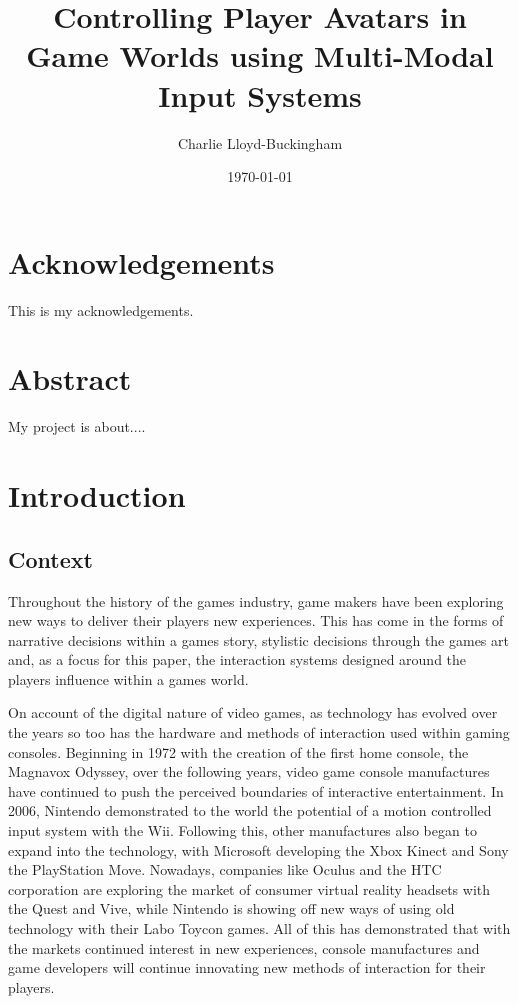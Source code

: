 \documentclass[11pt, a4paper]{article}
\title{Controlling Player Avatars in Game Worlds using Multi-Modal Input Systems}
\author{Charlie Lloyd-Buckingham}
\date{\today}
\begin{document}
\maketitle



\pagebreak
\section{Acknowledgements}	
This is my acknowledgements.

\section{Abstract}	
My project is about....



\pagebreak
\tableofcontents				%



\pagebreak
\section{Introduction}	
\subsection{Context}
Throughout the history of the games industry, game makers have been exploring new ways to deliver their players new experiences. This has come in the forms of narrative decisions within a games story, stylistic decisions through the games art and, as a focus for this paper, the interaction systems designed around the players influence within a games world. 

\hfill

On account of the digital nature of video games, as technology has evolved over the years so too has the hardware and methods of interaction used within gaming consoles. Beginning in 1972 with the creation of the first home console, the Magnavox Odyssey, over the following years, video game console manufactures have continued to push the perceived boundaries of interactive entertainment. In 2006, Nintendo demonstrated to the world the potential of a motion controlled input system with the Wii. Following this, other manufactures also began to expand into the technology, with Microsoft developing the Xbox Kinect and Sony the PlayStation Move. Nowadays, companies like Oculus and the HTC corporation are exploring the market of consumer virtual reality headsets with the Quest and Vive, while Nintendo is showing off new ways of using old technology with their Labo Toycon games. All of this has demonstrated that with the markets continued interest in new experiences, console manufactures and game developers will continue innovating new methods of interaction for their players.
\end{document}
